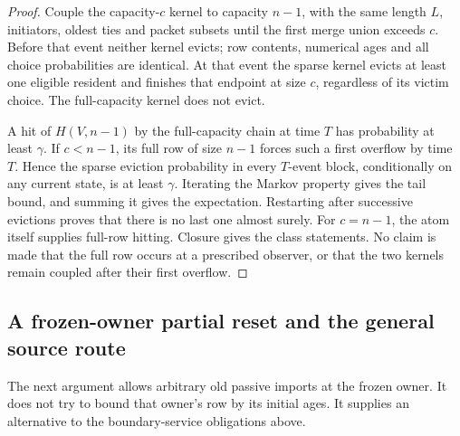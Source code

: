 \documentclass[11pt]{article}
\begin{document}
\begin{proof}
Couple the capacity-$c$ kernel to capacity $n-1$, with the same
length $L$, initiators, oldest ties and packet subsets until the
first merge union exceeds $c$. Before that event neither kernel
evicts; row contents, numerical ages and all choice probabilities
are identical. At that event the sparse kernel evicts at least
one eligible resident and finishes that endpoint at size $c$,
regardless of its victim choice. The full-capacity kernel does
not evict.

A hit of $H(V,n-1)$ by the full-capacity chain at time $T$ has
probability at least $\gamma$. If $c<n-1$, its full row of size
$n-1$ forces such a first overflow by time $T$. Hence the sparse
eviction probability in every $T$-event block, conditionally on
any current state, is at least $\gamma$. Iterating the Markov
property gives the tail bound, and summing it gives the expectation.
Restarting after successive evictions proves that there is no last
one almost surely. For $c=n-1$, the atom itself supplies full-row
hitting. Closure gives the class statements. No claim is made that
the full row occurs at a prescribed observer, or that the two
kernels remain coupled after their first overflow.
\end{proof}

\subsection{A frozen-owner partial reset and the general source route}

The next argument allows arbitrary old passive imports at the frozen
owner. It does not try to bound that owner's row by its initial ages.
It supplies an alternative to the boundary-service obligations above.
\end{document}
